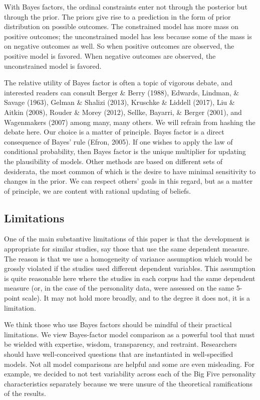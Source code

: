 \documentclass[english,man]{apa6}
\theoremstyle{definition}
\theoremstyle{definition}
\theoremstyle{remark}
\begin{document}
With Bayes factors, the ordinal constraints enter not through the
posterior but through the prior. The priors give rise to a prediction in
the form of prior distribution on possible outcomes. The constrained
model has more mass on positive outcomes; the unconstrained model has
less because some of the mass is on negative outcomes as well. So when
positive outcomes are observed, the positive model is favored. When
negative outcomes are observed, the unconstrained model is favored.

The relative utility of Bayes factor is often a topic of vigorous
debate, and interested readers can consult Berger \& Berry (1988),
Edwards, Lindman, \& Savage (1963), Gelman \& Shalizi (2013), Kruschke
\& Liddell (2017), Liu \& Aitkin (2008), Rouder \& Morey (2012), Sellke,
Bayarri, \& Berger (2001), and Wagenmakers (2007) among many, many
others. We will refrain from hashing the debate here. Our choice is a
matter of principle. Bayes factor is a direct consequence of Bayes' rule
(Efron, 2005). If one wishes to apply the law of conditional
probability, then Bayes factor is the unique multiplier for updating the
plausibility of models. Other methods are based on different sets of
desiderata, the most common of which is the desire to have minimal
sensitivity to changes in the prior. We can respect others' goals in
this regard, but as a matter of principle, we are content with rational
updating of beliefs.

\subsection{Limitations}\label{limitations}

One of the main substantive limitations of this paper is that the
development is appropriate for similar studies, say those that use the
same dependent measure. The reason is that we use a homogeneity of
variance assumption which would be grossly violated if the studies used
different dependent variables. This assumption is quite reasonable here
where the studies in each corpus had the same dependent measure (or, in
the case of the personality data, were assessed on the same 5-point
scale). It may not hold more broadly, and to the degree it does not, it
is a limitation.

We think those who use Bayes factors should be mindful of their
practical limitations. We view Bayes-factor model comparison as a
powerful tool that must be wielded with expertise, wisdom, transparency,
and restraint. Researchers should have well-conceived questions that are
instantiated in well-specified models. Not all model comparisons are
helpful and some are even misleading. For example, we decided to not
test variability across each of the Big Five personality characteristics
separately because we were unsure of the theoretical ramifications of
the results.
\end{document}
